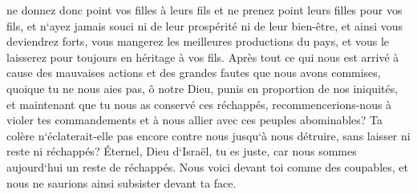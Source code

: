 \verse ne donnez donc point vos filles à leurs fils et ne prenez point leurs filles pour vos fils, et n`ayez jamais souci ni de leur prospérité ni de leur bien-être, et ainsi vous deviendrez forts, vous mangerez les meilleures productions du pays, et vous le laisserez pour toujours en héritage à vos fils. 
\verse Après tout ce qui nous est arrivé à cause des mauvaises actions et des grandes fautes que nous avons commises, quoique tu ne nous aies pas, ô notre Dieu, punis en proportion de nos iniquités, et maintenant que tu nous as conservé ces réchappés, 
\verse recommencerions-nous à violer tes commandements et à nous allier avec ces peuples abominables? Ta colère n`éclaterait-elle pas encore contre nous jusqu`à nous détruire, sans laisser ni reste ni réchappés? 
\verse Éternel, Dieu d`Israël, tu es juste, car nous sommes aujourd`hui un reste de réchappés. Nous voici devant toi comme des coupables, et nous ne saurions ainsi subsister devant ta face. 

\chapter{}

